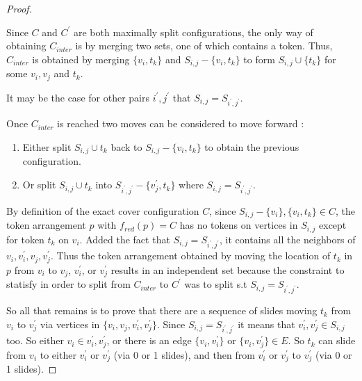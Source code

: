 \begin{proof}
\begin{obs}
Since $C$ and $C^{'}$ are both maximally split configurations, the only way of obtaining $C_{inter}$ is by merging two sets, one of which contains
a token. Thus, $C_{inter}$ is obtained by merging $\{v_i, t_k\}$ and $S_{i,j} - \{v_i, t_k\}$  to form $S_{i,j} \cup \{t_k\}$ for
some $v_i, v_j$ and $t_k$.
\end{obs}

\begin{remark}
It may be the case for other pairs $i^{'}, j^{'}$ that $S_{i,j} = S_{i^{'}, j^{'}}$.
\end{remark}

Once $C_{inter}$ is reached two moves can be considered to move forward :
\begin{enumerate}
  \item Either split $S_{i,j} \cup t_k$ back to $S_{i,j} - \{v_i,t_k\}$ to obtain the previous configuration.
  \item Or split $S_{i,j} \cup t_k$ into $S_{i^{'},j^{'}} - \{v_j^{'},t_k\}$ where $S_{i,j} = S_{i^{'}, j^{'}}$.
\end{enumerate}

By definition of the exact cover configuration $C$, since $S_{i,j} - \{v_i\}, \{v_i, t_k\} \in C$, the token
arrangement $p$ with $f_{red}(p) = C$ has no tokens on vertices in $S_{i,j}$ except for token $t_k$ on $v_i$. Added the fact
that $S_{i,j} = S_{i^{'}, j^{'}}$, it contains all the neighbors of $v_i, v_i^{'}, v_j, v_j^{'}$. Thus the token
arrangement obtained by moving the location of $t_k$ in $p$ from $v_i$ to $v_j$, $v_i^{'}$, or $v_j^{'}$ results in an independent set because
the constraint to statisfy in order to split from $C_{inter}$ to $C^{'}$ was to split s.t $S_{i,j} = S_{i^{'}, j^{'}}$.

So all that remains is to prove that there are a sequence of slides moving $t_k$ from $v_i$ to $v_j^{'}$ via vertices
in $\{v_i, v_j, v_i^{'}, v_j^{'}\}$. Since $S_{i,j} = S_{i^{'},j^{'}}$ it means that $v_i^{'}, v_j^{'} \in S_{i,j}$ too.
So either $v_i \in {v_i^{'}, v_j^{'}}$, or there is an edge $\{v_i, v_i^{'}\}$ or $\{v_i, v_j^{'}\} \in E$. So $t_k$ can slide
from $v_i$ to either $v_i^{'}$ or $v_j^{'}$ (via 0 or 1 slides), and then from $v_i^{'}$ or $v_j^{'}$ to $v_j^{'}$ (via 0 or 1 slides).

\end{proof}

\begin{example}{}
\end{example}


